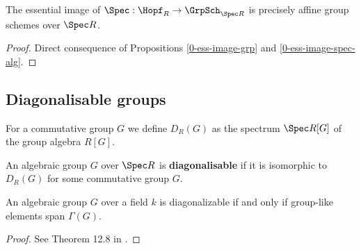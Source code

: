 \begin{proposition}
  \label{0-ess-image-spec-hopf}
  \leanok

  The essential image of $\Spec : \Hopf_R \to \GrpSch_{\Spec R}$ is precisely affine group schemes over $\Spec R$.
\end{proposition}
\begin{proof}
  \leanok

  Direct consequence of Propositions \ref{0-ess-image-grp} and \ref{0-ess-image-spec-alg}.
\end{proof}


\subsection{Diagonalisable groups}


\begin{definition}
  \label{0-spec-grp-alg}
  \leanok

  For a commutative group $G$ we define $D_R(G)$ as the spectrum $\Spec R[G]$ of the group algebra $R[G]$.
\end{definition}


\begin{definition}
  \label{0-diag}

  An algebraic group $G$ over $\Spec R$ is {\bf diagonalisable} if it is isomorphic to $D_R(G)$ for some commutative group $G$.
\end{definition}


\begin{theorem}
  \label{0-diag-iff-grp-like-span}
  \leanok

  An algebraic group $G$ over a field $k$ is diagonalizable if and only if group-like elements span $\Gamma(G)$.
\end{theorem}
\begin{proof}

  See Theorem 12.8 in \cite{Milne_2017}.
\end{proof}


